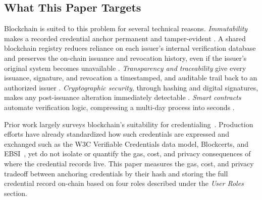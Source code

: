 \documentclass[conference]{IEEEtran}
\begin{document}


\subsection{What This Paper Targets}
Blockchain is suited to this problem for several technical reasons. \emph{Immutability} makes a recorded credential anchor permanent and tamper-evident \cite{cheng_smartcontract,capece_trust}. A shared blockchain registry reduces reliance on each issuer's internal verification database and preserves the on-chain issuance and revocation history, even if the issuer's original system becomes unavailable \cite{slr_certificate,rustemi_diar}. \emph{Transparency and traceability} give every issuance, signature, and revocation a timestamped, and auditable trail back to an authorized issuer \cite{cardenas_prototype,capece_trust}. \emph{Cryptographic security}, through hashing and digital signatures, makes any post-issuance alteration immediately detectable \cite{alhemairy_uae}. \emph{Smart contracts} automate verification logic, compressing a multi-day process into seconds \cite{slr_certificate}.

Prior work largely surveys blockchain's suitability for credentialing~\cite{rustemi_diar}. Production efforts have already standardized how such credentials are expressed and exchanged such as the W3C Verifiable Credentials data model, Blockcerts, and EBSI~\cite{w3c_vcdm2,blockcerts_mit,tan_ebsi}, yet do not isolate or quantify the gas, cost, and privacy consequences of where the credential records live. This paper measures the gas, cost, and privacy tradeoff between anchoring credentials by their hash and storing the full credential record on-chain based on four roles described under the \emph{User Roles} section. 
\end{document}
